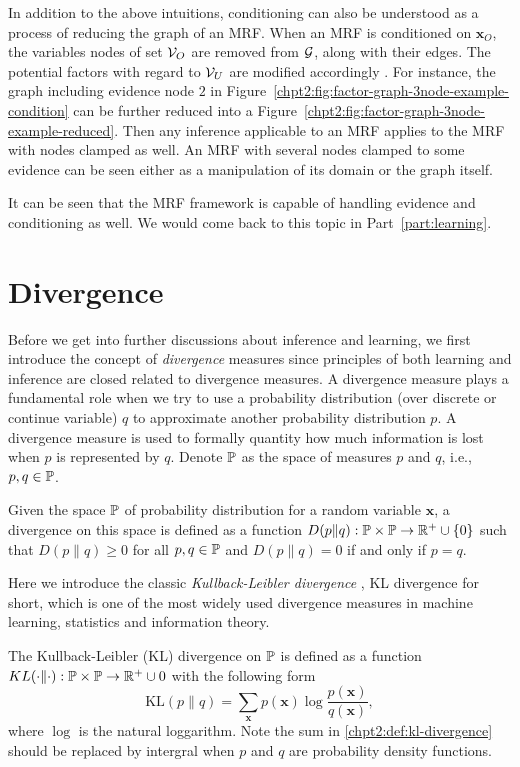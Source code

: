 In addition to the above intuitions, conditioning can also be understood as a process of reducing the graph of an MRF. When an MRF is conditioned on $\bm{x}_O$, the variables nodes of set $\mathcal{V}_O$ are removed from $\mathcal{G}$, along with their edges. The potential factors with regard to $\mathcal{V}_U$ are modified accordingly \cite[Chapter~4.2.3]{koller2009pgm}. For instance,
the graph including evidence node $2$ in Figure~\ref{chpt2:fig:factor-graph-3node-example-condition} can be further reduced into a Figure~\ref{chpt2:fig:factor-graph-3node-example-reduced}. Then any inference applicable to an MRF applies to the MRF with nodes clamped as well. An MRF with several nodes clamped to some evidence can be seen either as a manipulation of its domain or the graph itself.


It can be seen that the MRF framework is capable of handling evidence and conditioning as well. We would come back to this topic in Part~\ref{part:learning}.

\section{Divergence}\label{chpt2:sec:devergence}
Before we get into further discussions about inference and learning, we first introduce the concept of \textit{divergence} measures since principles of both learning and inference are closed related to divergence measures.
A divergence measure plays a fundamental role when we try to use a probability distribution (over discrete or continue variable)  $q$ to approximate another probability distribution $p$. A divergence measure is used to formally quantity how much information is lost when $p$ is represented by $q$. Denote $\mathbb{P}$ as the space of measures $p$ and $q$, i.e., $p, q \in \mathbb{P}$.
\begin{definition}
  Given the space $\mathbb{P}$ of probability distribution for a random variable $\bm{x}$, a divergence on this space is defined as a function $D(p\|q): \mathbb{P} \times \mathbb{P} \rightarrow \mathbb{R}^{+}\cup \{0\}$ such that $D(p\|q) \geq 0$ for all $p, q \in \mathbb{P}$ and $D(p\|q)=0$ if and only if $p=q$.
\end{definition}

Here we introduce the classic \textit{Kullback-Leibler divergence} \cite{kullback1959, kullback1951}, KL divergence for short, which is one of the most widely used divergence measures in machine learning, statistics and information theory.
\begin{definition}
  The Kullback-Leibler (KL) divergence on $\mathbb{P}$ is defined as a function $KL(\cdot \| \cdot): \mathbb{P} \times \mathbb{P} \rightarrow \mathbb{R}^{+} \cup {0}$ with the following form
  \begin{equation}\label{chpt2:def:kl-divergence}
    \mathrm{KL}(p\|q) = \sum_{\bm{x}}p(\bm{x}) \log{\frac{p(\bm{x})}{q(\bm{x})}},
  \end{equation}
  where $\log$ is the natural loggarithm. Note the sum in \eqref{chpt2:def:kl-divergence} should be replaced by intergral when $p$ and $q$ are probability density functions.
\end{definition}


